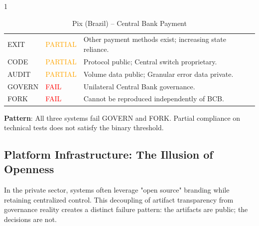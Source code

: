 \documentclass{article}
\begin{document}
\begin{table}[htbp]
    \begin{subtable}{1\textwidth}
        \centering
        \caption{Pix (Brazil) -- Central Bank Payment}
        \small
        \begin{tabular}{@{}llp{8.5cm}@{}}
            \toprule
            EXIT & \textcolor{orange}{PARTIAL} & Other payment methods exist; increasing state reliance. \\
            CODE & \textcolor{orange}{PARTIAL} & Protocol public; Central switch proprietary. \\
            AUDIT & \textcolor{orange}{PARTIAL} & Volume data public; Granular error data private. \\
            GOVERN & \textcolor{red}{FAIL} & Unilateral Central Bank governance. \\
            FORK & \textcolor{red}{FAIL} & Cannot be reproduced independently of BCB. \\
            \bottomrule
        \end{tabular}
    \end{subtable}
\end{table}

\textbf{Pattern}: All three systems fail GOVERN and FORK. Partial compliance on technical tests does not satisfy the binary threshold.

\subsection{Platform Infrastructure: The Illusion of Openness}

In the private sector, systems often leverage "open source" branding while retaining centralized control. This decoupling of artifact transparency from governance reality creates a distinct failure pattern: the artifacts are public; the decisions are not.
\end{document}
